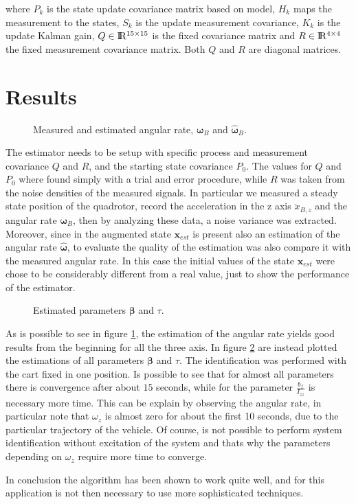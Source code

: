 \noindent where $P_k$ is the state update covariance matrix based on model, $H_k$ maps the measurement to the states, $S_k$ is the update measurement covariance, $K_k$ is the update Kalman gain, $Q\in\rm I\!R^{15\times 15}$ is the fixed covariance matrix and $R\in\rm I\!R^{4\times 4}$ the fixed measurement covariance matrix. Both $Q$ and $R$ are diagonal matrices.


\section{Results}
\label{resultsKalman}

\begin{figure}[h]
	\centering
 	
 	\caption{Measured and estimated angular rate, $\boldsymbol{\omega}_B$ and $\hat{\boldsymbol{\omega}}_B$.}
 	\label{fig:omegaKalman}		
\end{figure}

\noindent The estimator needs to be setup with specific process and measurement covariance $Q$ and $R$, and the starting state covariance $P_0$. The values for $Q$ and $P_0$ where found simply with a trial and error procedure, while $R$ was taken from the noise densities of the measured signals. In particular we measured a steady state position of the quadrotor, record the acceleration in the z axis $\ddot{x}_{B,z}$ and the angular rate $\boldsymbol{\omega}_B$, then by analyzing these data, a noise variance was extracted. Moreover, since in the augmented state $\mathbf{x}_{est}$ is present also an estimation of the angular rate $\hat{\boldsymbol{\omega}}$, to evaluate the quality of the estimation was also compare it with the measured angular rate. In this case the initial values of the state $\mathbf{x}_{est}$ were chose to be considerably different from a real value, just to show the performance of the estimator.

\begin{figure}[h]
	\centering
	
	
	
	\caption{Estimated parameters $\boldsymbol{\beta}$ and $\tau$.}
	\label{fig:betaTauKalman}
\end{figure}

\noindent As is possible to see in figure \ref{fig:omegaKalman}, the estimation of the angular rate yields good results from the beginning for all the three axis. In figure \ref{fig:betaTauKalman} are instead plotted the estimations of all parameters $\boldsymbol{\beta}$ and $\tau$. The identification was performed with the cart fixed in one position. Is possible to see that for almost all parameters there is convergence after about $15$ seconds, while for the parameter $\frac{b_f}{I_{zz}}$ is necessary more time. This can be explain by observing the angular rate, in particular note that $\omega_z$ is almost zero for about the first 10 seconds, due to the particular trajectory of the vehicle. Of course, is not possible to perform system identification without excitation of the system and thats why the parameters depending on $\omega_z$ require more time to converge.

\noindent In conclusion the algorithm has been shown to work quite well, and for this application is not then necessary to use more sophisticated techniques.
